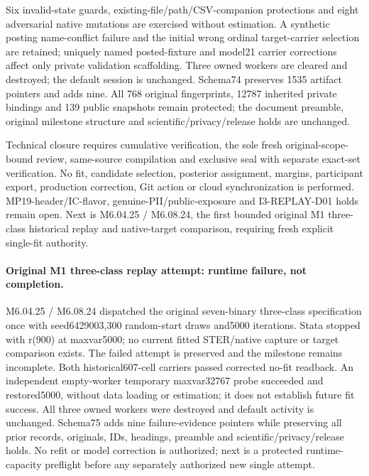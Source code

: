 \documentclass[11pt,a4paper]{article}
\begin{document}
Six invalid-state guards, existing-file/path/CSV-companion protections and eight adversarial native mutations are exercised without estimation. A synthetic posting name-conflict failure and the initial wrong ordinal target-carrier selection are retained; uniquely named posted-fixture and model21 carrier corrections affect only private validation scaffolding. Three owned workers are cleared and destroyed; the default session is unchanged. Schema74 preserves 1535 artifact pointers and adds nine. All 768 original fingerprints, 12787 inherited private bindings and 139 public snapshots remain protected; the document preamble, original milestone structure and scientific/privacy/release holds are unchanged.

Technical closure requires cumulative verification, the sole fresh original-scope-bound review, same-source compilation and exclusive seal with separate exact-set verification. No fit, candidate selection, posterior assignment, margins, participant export, production correction, Git action or cloud synchronization is performed. MP19-header/IC-flavor, genuine-PII/public-exposure and I3-REPLAY-D01 holds remain open. Next is M6.04.25 / M6.08.24, the first bounded original M1 three-class historical replay and native-target comparison, requiring fresh explicit single-fit authority.
\paragraph{Original M1 three-class replay attempt: runtime failure, not completion.}
M6.04.25 / M6.08.24 dispatched the original seven-binary three-class specification once with seed6429003,300 random-start draws and5000 iterations. Stata stopped with r(900) at maxvar5000; no current fitted STER/native capture or target comparison exists. The failed attempt is preserved and the milestone remains incomplete. Both historical607-cell carriers passed corrected no-fit readback. An independent empty-worker temporary maxvar32767 probe succeeded and restored5000, without data loading or estimation; it does not establish future fit success. All three owned workers were destroyed and default activity is unchanged. Schema75 adds nine failure-evidence pointers while preserving all prior records, originals, IDs, headings, preamble and scientific/privacy/release holds. No refit or model correction is authorized; next is a protected runtime-capacity preflight before any separately authorized new single attempt.
\end{document}
